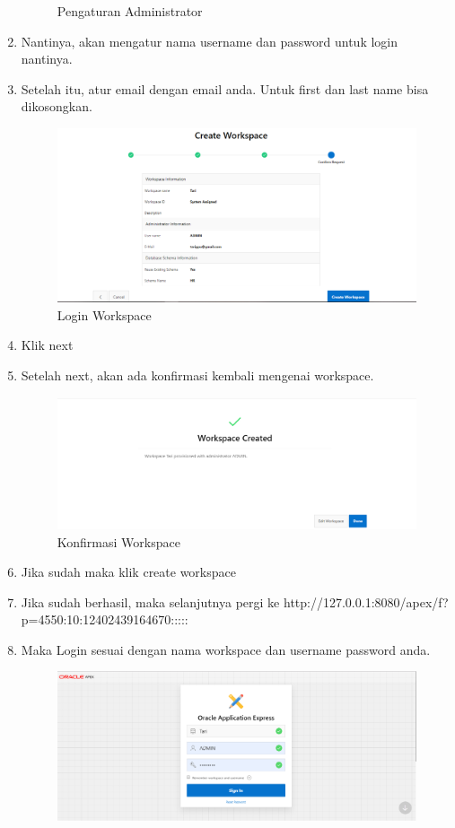 \begin{enumerate}
\begin{figure}[!htbp]
        \caption{Pengaturan Administrator}
    \end{figure}
    \item Nantinya, akan mengatur nama username dan password untuk login nantinya.
    \item Setelah itu, atur email dengan email anda. Untuk first dan last name bisa dikosongkan.
     \begin{figure}[!htbp]
        \centering
        \includegraphics[scale=0.3]{figures/n6.PNG}
        \caption{Login Workspace}
    \end{figure}
    \item Klik next
    \item Setelah next, akan ada konfirmasi kembali mengenai workspace.
    \begin{figure}[!htbp]
        \centering
        \includegraphics[scale=0.3]{figures/n7.PNG}
        \caption{Konfirmasi Workspace}
    \end{figure}
    \item Jika sudah maka klik create workspace
\newpage
    \item Jika sudah berhasil, maka selanjutnya pergi ke http://127.0.0.1:8080/apex/f?p=4550:10:12402439164670:::::
    \item Maka Login sesuai dengan nama workspace dan username password anda.
    \begin{figure}[!htbp]
        \centering
        \includegraphics[scale=0.3]{figures/n8.PNG}

\end{figure}
\end{enumerate}
